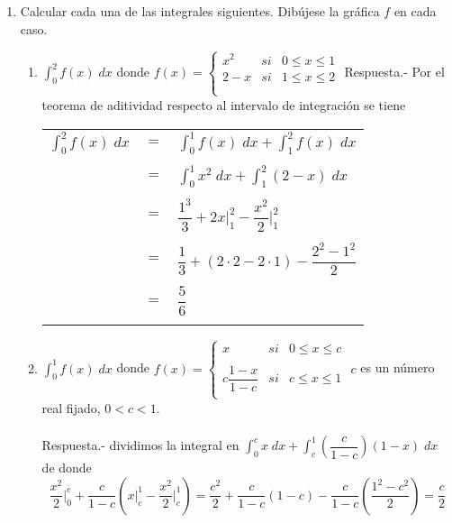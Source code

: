 \begin{enumerate}[\bfseries 1.]
    \item Calcular cada una de las integrales siguientes. Dibújese la gráfica $f$ en cada caso.
	\begin{enumerate}[\bfseries (a)]

	    \item $\displaystyle\int_0^2 f(x) \; dx$ donde 
		$f(x) =  \left\{ \begin{array}{rcl}
		    x^2&si&0\leq x \leq 1\\
		    2-x&si&1\leq x\leq 2\\\\
		\end{array}\right.$
		Respuesta.-\; Por el teorema de aditividad respecto al intervalo de integración se tiene 
		\begin{center}
		    \begin{tabular}{rcl}
			$\displaystyle\int_0^2 f(x) \; dx$&$=$&$\displaystyle\int_0^1 f(x) \; dx + \int_1^2 f(x) \; dx$\\
			\\&$=$&$\displaystyle\int_0^1 x^2 \; dx + \int_1^2 (2-x) \; dx$\\
			\\&$=$&$\dfrac{1^3}{3} + 2x\bigg|_1^2  - \dfrac{x^2}{2}\bigg|_1^2$\\
			\\&$=$&$\dfrac{1}{3} + (2\cdot 2 - 2\cdot 1) - \dfrac{2^2 - 1^2}{2}$\\
			\\&$=$&$\dfrac{5}{6}$\\\\
		    \end{tabular}
		\end{center}

	    \item $\displaystyle\int_0^1 f(x)\; dx$ donde 
		$f(x) = \left\{ \begin{array}{rcl}
		    x&si&0\leq x \leq c\\
		    \\c\dfrac{1-x}{1-c}&si&c\leq x \leq 1\\
		\end{array}\right.$
		$c$ es un número real fijado, $0<c<1.$\\\\
		Respuesta.-\; dividimos la integral en $\displaystyle\int_0^c x \; dx  + \int_c^1 \left( \dfrac{c}{1-c} \right) (1-x) \; dx$ \; de donde $$\dfrac{x^2}{2}\bigg|_0^c + \dfrac{c}{1-c} \left(x \bigg|_c^1 - \dfrac{x^2}{2}\bigg|_c^1\right) = \dfrac{c^2}{2} + \dfrac{c}{1-c}(1 - c) - \dfrac{c}{1-c}\left(\dfrac{1^2 - c^2}{2}\right) = \dfrac{c}{2}$$\\


\end{enumerate}
\end{enumerate}
